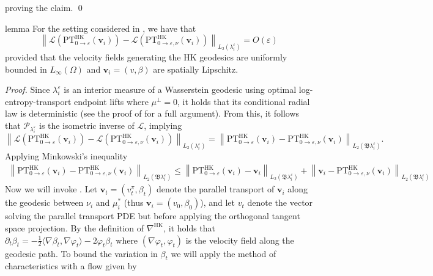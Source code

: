 \documentclass[11pt]{article}
\begin{document}
proving the claim. 
\qed{}
\\
\begin{restatable}{lemma}{} \label{PT stability}
    For the setting considered in , we have that 
    \[\left\|\mathcal{L}(\text{PT}^{\text{HK}}_{0 \rightarrow \varepsilon}(\mathbf{v}_i)) - \mathcal{L}(\text{PT}^{\text{HK}}_{0\rightarrow \varepsilon, \nu}(\mathbf{v}_i)) \right\|_{L_2(\lambda_i^{\varepsilon})} = O(\varepsilon)\]
    provided that the velocity fields generating the HK geodesics are uniformly bounded in $L_\infty(\Omega)$ and $\mathbf{v}_i = (v, \beta)$ are spatially Lipschitz.
\end{restatable}
\noindent \textit{Proof.} Since $\lambda_i^\varepsilon$ is an interior measure of a Wasserstein geodesic using optimal log-entropy-transport endpoint lifts where $\mu^\perp = 0$, it holds that its conditional radial law is deterministic (see the proof of  for a full argument). From this, it follows that $\mathcal{P}_{\lambda_{i}^\varepsilon}$ is the isometric inverse of $\mathcal{L}$, implying
\[\left\|\mathcal{L}(\text{PT}^{\text{HK}}_{0 \rightarrow \varepsilon}(\mathbf{v}_i)) - \mathcal{L}(\text{PT}^{\text{HK}}_{0\rightarrow \varepsilon, \nu}(\mathbf{v}_i)) \right\|_{L_2(\lambda_i^{\varepsilon})}  = \left\|\text{PT}^{\text{HK}}_{0 \rightarrow \varepsilon}(\mathbf{v}_i) - \text{PT}^{\text{HK}}_{0\rightarrow \varepsilon, \nu}(\mathbf{v}_i) \right\|_{L_2(\mathfrak{B}\lambda_i^{\varepsilon})}. \]
Applying Minkowski's inequality
\begin{align*}
    \left\|\text{PT}^{\text{HK}}_{0 \rightarrow \varepsilon}(\mathbf{v}_i) - \text{PT}^{\text{HK}}_{0\rightarrow \varepsilon, \nu}(\mathbf{v}_i) \right\|_{L_2(\mathfrak{B}\lambda_i^{\varepsilon})} \leq \left\|\text{PT}^{\text{HK}}_{0 \rightarrow \varepsilon}(\mathbf{v}_i) - \mathbf{v}_i \right\|_{L_2(\mathfrak{B}\lambda_i^{\varepsilon})} + \left\|\mathbf{v}_i - \text{PT}^{\text{HK}}_{0\rightarrow \varepsilon, \nu}(\mathbf{v}_i) \right\|_{L_2(\mathfrak{B}\lambda_i^{\varepsilon})}
\end{align*}
Now we will invoke . Let $\mathbf{v}_t = (v_t^\pi, \beta_t)$ denote the parallel transport of $\mathbf{v}_i$ along the geodesic between $\nu_i$ and $\mu_i^*$ (thus $\mathbf{v}_i = (v_0, \beta_0)$), and let $v_t$ denote the vector solving the parallel transport PDE but before applying the orthogonal tangent space projection. By the definition of $\nabla^{\text{HK}}$, it holds that $\partial_t\beta_t = - \frac{1}{2}\langle \nabla \beta_t,\nabla \varphi_t\rangle - 2\varphi_t\beta_t$ where $(\nabla \varphi_t, \varphi_t)$ is the velocity field along the geodesic path. To bound the variation in $\beta_t$ we will apply the method of characteristics with a flow given by 
\end{document}
